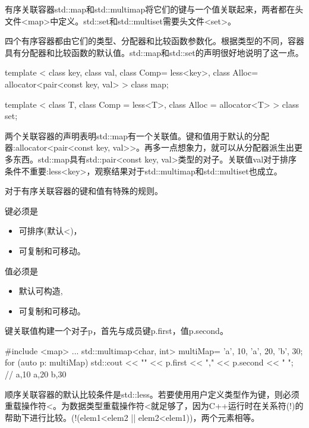 


有序关联容器std::map和std::multimap将它们的键与一个值关联起来，两者都在头文件<map>中定义。std::set和std::multiset需要头文件<set>。

四个有序容器都由它们的类型、分配器和比较函数参数化。根据类型的不同，容器具有分配器和比较函数的默认值。std::map和std::set的声明很好地说明了这一点。


\begin{cpp}
template < class key, class val, class Comp= less<key>,
		   class Alloc= allocator<pair<const key, val> >
class map;

template < class T, class Comp = less<T>,
		   class Alloc = allocator<T> >
class set;
\end{cpp}


两个关联容器的声明表明std::map有一个关联值。键和值用于默认的分配器:allocator<pair<const key, val>{}>。再多一点想象力，就可以从分配器派生出更多东西。std::map具有std::pair<const key, val>类型的对子。关联值val对于排序条件不重要:less<key>，观察结果对于std::multimap和std::multiset也成立。


对于有序关联容器的键和值有特殊的规则。

键必须是

\begin{itemize}
\item 
可排序(默认<)，

\item 
可复制和可移动。
\end{itemize}

值必须是

\begin{itemize}
\item 
默认可构造,

\item 
可复制和可移动。
\end{itemize}

键关联值构建一个对子p，首先与成员键p.first，值p.second。

\begin{cpp}
#include <map>
...
std::multimap<char, int> multiMap= {{'a', 10}, {'a', 20}, {'b', 30}};
for (auto p: multiMap) std::cout << "{" << p.first << "," << p.second << "} ";
				// {a,10} {a,20} {b,30}
\end{cpp}


顺序关联容器的默认比较条件是std::less。若要使用用户定义类型作为键，则必须重载操作符<。为数据类型重载操作符<就足够了，因为C++运行时在关系符(!)的帮助下进行比较。(!(elem1<elem2 || elem2<elem1))，两个元素相等。


